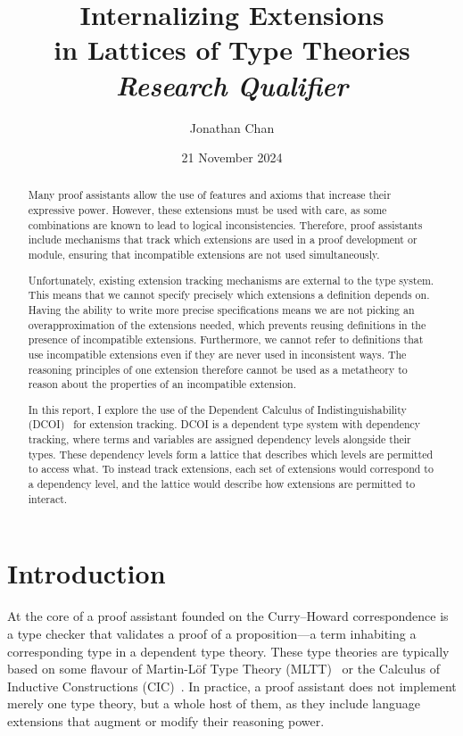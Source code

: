 \documentclass{article}
\title{\textbf{Internalizing Extensions \\ in Lattices of Type Theories} \\[1ex]
  \Large{\textit{Research Qualifier}}}
\author{Jonathan Chan}
\date{21 November 2024}
\begin{document}
\maketitle

\begin{abstract}
  Many proof assistants allow the use of features and axioms
  that increase their expressive power.
  However, these extensions must be used with care,
  as some combinations are known to lead to logical inconsistencies.
  Therefore, proof assistants include mechanisms that track
  which extensions are used in a proof development or module,
  ensuring that incompatible extensions are not used simultaneously.

  Unfortunately, existing extension tracking mechanisms are external to the type system.
  This means that we cannot specify precisely which extensions a definition depends on.
  Having the ability to write more precise specifications
  means we are not picking an overapproximation of the extensions needed,
  which prevents reusing definitions in the presence of incompatible extensions.
  Furthermore, we cannot refer to definitions that use incompatible extensions
  even if they are never used in inconsistent ways.
  The reasoning principles of one extension therefore cannot be used as a metatheory
  to reason about the properties of an incompatible extension.

  In this report, I explore the use of the Dependent Calculus of Indistinguishability
  (DCOI)~\citep{dcoi} for extension tracking.
  DCOI is a dependent type system with dependency tracking,
  where terms and variables are assigned dependency levels alongside their types.
  These dependency levels form a lattice that describes
  which levels are permitted to access what.
  To instead track extensions,
  each set of extensions would correspond to a dependency level,
  and the lattice would describe how extensions are permitted to interact.
\end{abstract}

\section{Introduction}

At the core of a proof assistant founded on the Curry--Howard correspondence
is a type checker that validates a proof of a proposition---a term inhabiting
a corresponding type in a dependent type theory.
These type theories are typically based on some flavour of
Martin-L\"of Type Theory (MLTT)~\citep{mltt}
or the Calculus of Inductive Constructions (CIC)~\citep{cic}.
In practice, a proof assistant does not implement merely one type theory,
but a whole host of them, as they include language extensions
that augment or modify their reasoning power.
\end{document}
